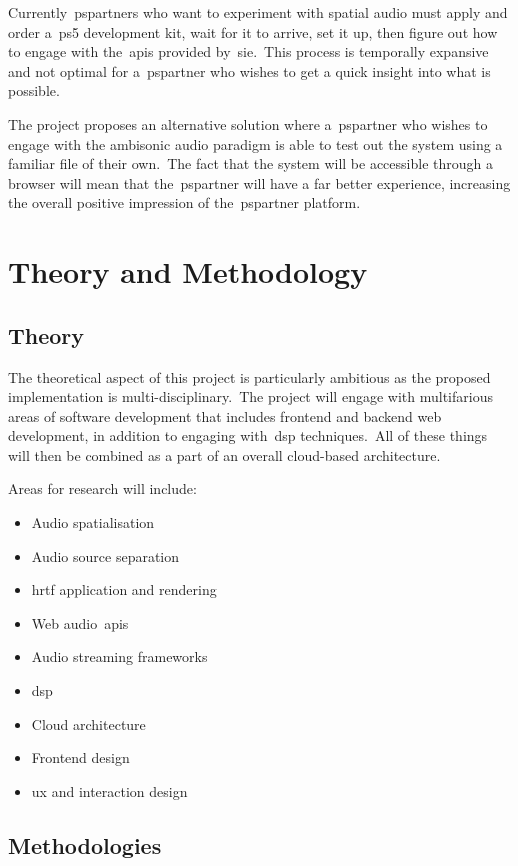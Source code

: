 \documentclass[a4paper, 12pt, british]{article}
\begin{document}
Currently~\glspl{pspartner} who want to experiment with spatial audio must apply and order a~\gls{ps5} development kit, wait for it to arrive, set it up, then figure out how to engage with the~\glspl{api} provided by~\gls{sie}.\ This process is temporally expansive and not optimal for a~\gls{pspartner} who wishes to get a quick insight into what is possible.

The project proposes an alternative solution where a~\gls{pspartner} who wishes to engage with the ambisonic audio paradigm is able to test out the system using a familiar file of their own.\ The fact that the system will be accessible through a browser will mean that the~\gls{pspartner} will have a far better experience, increasing the overall positive impression of the~\gls{pspartner} platform.

\section{Theory and Methodology}\label{sec:theory-and-methodology}
\subsection{Theory}\label{subsec:theory}
The theoretical aspect of this project is particularly ambitious as the proposed implementation is multi-disciplinary.\ The project will engage with multifarious areas of software development that includes frontend and backend web development, in addition to engaging with~\gls{dsp} techniques.\ All of these things will then be combined as a part of an overall cloud-based architecture.

Areas for research will include:

\begin{itemize}
    \item Audio spatialisation
    \item Audio source separation
    \item \gls{hrtf} application and rendering
    \item Web audio~\glspl{api}
    \item Audio streaming frameworks
    \item \gls{dsp}
    \item Cloud architecture
    \item Frontend design
    \item \gls{ux} and interaction design
\end{itemize}

\subsection{Methodologies}\label{subsec:methodologies}
\end{document}
